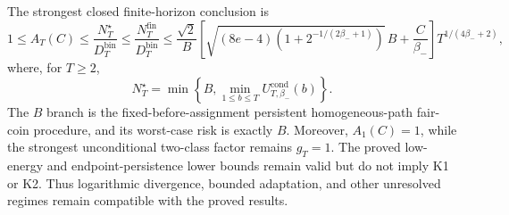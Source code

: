 The strongest closed finite-horizon conclusion is
\[
1\le A_T(C)\le\frac{N_T^\star}{D_T^{\mathrm{bin}}}\le\frac{N_T^{\mathrm{fin}}}{D_T^{\mathrm{bin}}}\le\frac{\sqrt2}{B}\left[\sqrt{(8e-4)\left(1+2^{-1/(2\beta_-+1)}\right)}\,B+\frac C{\beta_-}\right]T^{1/(4\beta_-+2)},
\]
where, for \(T\ge2\),
\[
N_T^\star=\min\left\{B,\min_{1\le b\le T}U_{T,\beta_-}^{\mathrm{cond}}(b)\right\}.
\]
The \(B\) branch is the fixed-before-assignment persistent homogeneous-path fair-coin procedure, and its worst-case risk is exactly \(B\). Moreover, \(A_1(C)=1\), while the strongest unconditional two-class factor remains \(g_T=1\). The proved low-energy and endpoint-persistence lower bounds remain valid but do not imply K1 or K2. Thus logarithmic divergence, bounded adaptation, and other unresolved regimes remain compatible with the proved results.